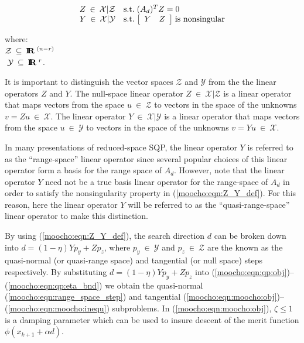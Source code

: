 \documentclass[pdf,ps2pdf,11pt]{SANDreport}
\begin{document}
{\bsinglespace
\begin{equation}
\begin{array}{ll}
Z \:\in\:\mathcal{X}|\mathcal{Z}
	& \mbox{s.t.} \; (A_d)^T Z = 0 \\
Y \:\in\:\mathcal{X}|\mathcal{Y}
	& \mbox{s.t.} \; {\bmat{cc} Y & Z \emat} \; \mbox{is nonsingular}
\end{array}
\label{moocho:eqn:Z_Y_def}
\end{equation}
\begin{tabbing}
\hspace{4ex}where:\hspace{5ex}\= \\
\>	$\mathcal{Z} \:\subseteq\:\mbox{\textbf{I}}\hspace{-0.6ex}\mbox{\textbf{R}}\:^{(n-r)}$ \\
\>	$\; \mathcal{Y} \:\subseteq\:\mbox{\textbf{I}}\hspace{-0.6ex}\mbox{\textbf{R}}\:^{r}$.
\end{tabbing}
\esinglespace}
%
It is important to distinguish the vector spaces $\mathcal{Z}$ and
$\mathcal{Y}$ from the the linear operators $Z$ and $Y$.  The null-space
linear operator $Z\:\in\:\mathcal{X}|\mathcal{Z}$ is a linear operator that
maps vectors from the space $u\:\in\:\mathcal{Z}$ to vectors in the space of
the unknowns $v = Z u \:\in\:\mathcal{X}$.  The linear operator
$Y\:\in\:\mathcal{X}|\mathcal{Y}$ is a linear operator that maps vectors from
the space $u\:\in\:\mathcal{Y}$ to vectors in the space of the unknowns $v = Y
u \:\in\:\mathcal{X}$.

In many presentations of reduced-space SQP, the linear operator $Y$ is
referred to as the ``range-space'' linear operator since several popular
choices of this linear operator form a basis for the range space of $A_d$.
However, note that the linear operator $Y$ need not be a true basis linear
operator for the range-space of $A_d$ in order to satisfy the nonsingularity
property in (\ref{moocho:eqn:Z_Y_def}).  For this reason, here the linear
operator $Y$ will be referred to as the ``quasi-range-space'' linear operator
to make this distinction.

By using (\ref{moocho:eqn:Z_Y_def}), the search direction $d$ can be broken
down into $d = (1-\eta) Y p_y + Z p_z$, where $p_y \:\in\:\mathcal{Y}$ and
$p_z \:\in\:\mathcal{Z}$ are the known as the quasi-normal (or quasi-range
space) and tangential (or null space) steps respectively.  By substituting $d
= (1-\eta) Y p_y + Z p_z$ into
(\ref{moocho:eqn:qp:obj})--(\ref{moocho:eqn:qp:eta_bnd}) we obtain the
quasi-normal (\ref{moocho:eqn:range_space_step}) and tangential
(\ref{moocho:eqn:moocho:obj})--(\ref{moocho:eqn:moocho:inequ}) subproblems.  In
(\ref{moocho:eqn:moocho:obj}), $\zeta \leq 1 $ is a damping parameter which can
be used to insure descent of the merit function $\phi(x_{k+1}+\alpha
d)$.\\[1ex]
\end{document}
